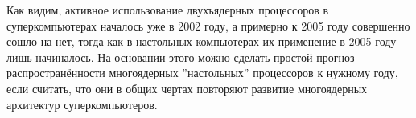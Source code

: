 Как видим, активное использование двухъядерных процессоров в суперкомпьютерах началось уже в 2002 году, а примерно к 2005 году совершенно сошло на нет, тогда как в настольных компьютерах их применение в 2005 году лишь начиналось. На основании этого можно сделать простой прогноз распространённости многоядерных ''настольных'' процессоров к нужному году, если считать, что они в общих чертах повторяют развитие многоядерных архитектур суперкомпьютеров.
